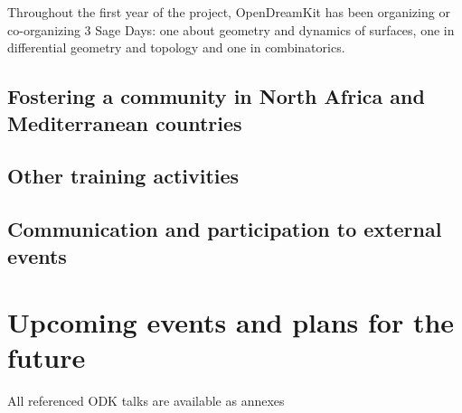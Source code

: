 \documentclass{../../Proposal/LaTeX-proposal/deliverablereport}
\begin{document}
Throughout the first year of the project, OpenDreamKit has been organizing or co-organizing
3 Sage Days: one about geometry and dynamics of surfaces, one in differential geometry and topology
 and one in combinatorics.







\subsection{Fostering a community in North Africa and Mediterranean countries}

\subsection{Other training activities}

\subsection{Communication and participation to external events}

















\section{Upcoming events and plans for the future}




\footnotesize{All referenced ODK talks are available as annexes}
\end{document}
